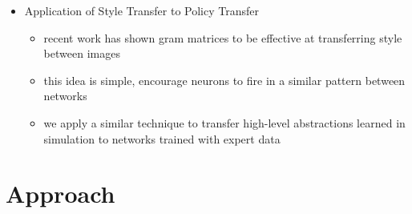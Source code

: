 \documentclass[paper=a4, fontsize=11pt]{scrartcl} %
\begin{document}
\begin{itemize}
\item Application of Style Transfer to Policy Transfer
	\begin{itemize}
		\item recent work has shown gram matrices to be effective at transferring style between images \cite{Gatys2015}
		\item this idea is simple, encourage neurons to fire in a similar pattern between networks
		\item we apply a similar technique to transfer high-level abstractions learned in simulation to networks trained with expert data
	\end{itemize}
\end{itemize}


\section{Approach} 
\end{document}
